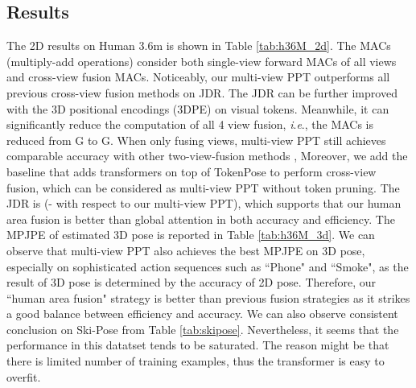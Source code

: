 \documentclass[runningheads]{llncs}
\newcommand{\ie}{\textit{i}.\textit{e}., }
\begin{document}
\subsection{Results}
\vspace{-0.5em}
The 2D results on Human 3.6m is shown in Table \ref{tab:h36M_2d}. The MACs (multiply-add operations) consider both single-view forward MACs of all views and cross-view fusion MACs. 
Noticeably, our multi-view PPT outperforms all previous cross-view fusion methods on JDR.
The JDR can be further improved with the 3D positional encodings (3DPE) \cite{ma2021transfusion} on visual tokens. 
Meanwhile, it can significantly reduce the computation of all 4 view fusion, \ie the MACs is reduced from G to G. 
When only fusing  views, multi-view PPT still achieves comparable accuracy with other two-view-fusion methods \cite{he2020epipolar,ma2021transfusion}, 
Moreover, we add the baseline that adds transformers on top of TokenPose to perform cross-view fusion, which can be considered as multi-view PPT without token pruning.  
The JDR is  (- with respect to our multi-view PPT), which supports that our human area fusion is better than global attention in both accuracy and efficiency. 
The MPJPE of estimated 3D pose is reported in Table \ref{tab:h36M_3d}. We can observe that multi-view PPT also achieves the best MPJPE on 3D pose, especially on sophisticated action sequences such as ``Phone" and ``Smoke", as the result of 3D pose is determined by the accuracy of 2D pose. 
Therefore, our ``human area fusion" strategy is better than previous fusion strategies as it strikes a good balance between efficiency and accuracy. 
We can also observe consistent conclusion on Ski-Pose from Table \ref{tab:skipose}. Nevertheless, it seems that the performance in this datatset tends to be saturated.  
The reason might be that there is limited number of training examples, thus the transformer is  easy to overfit. 



\begin{table}[t]
\centering
{}
\caption{\small{2D and 3D pose estimation accuracy comparison on Ski-Pose.} }
\label{tab:skipose}
\end{table}
\end{document}
